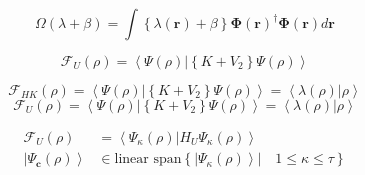 \documentclass[aps,preprint]{revtex4}%
\begin{document}
\[
\Omega\left(  \lambda+\beta\right)  =\int\left\{  \lambda\left(
\mathbf{r}\right)  +\beta\right\}  \mathbf{\Phi}\left(  \mathbf{r}\right)
^{\dagger}\mathbf{\Phi}\left(  \mathbf{r}\right)  d\mathbf{r}%
\]
%

\[
\mathcal{F}_{U}\left(  \rho\right)  =\left\langle \left.  \Psi\left(
\rho\right)  \right\vert \left\{  K+V_{2}\right\}  \Psi\left(  \rho\right)
\right\rangle
\]
%

\[
\mathcal{F}_{HK}\left(  \rho\right)  =\left\langle \left.  \Psi\left(
\rho\right)  \right\vert \left\{  K+V_{2}\right\}  \Psi\left(  \rho\right)
\right\rangle =\left\langle \lambda\left(  \rho\right)  \left\vert
\rho\right.  \right\rangle
\]%
\[
\mathcal{F}_{U}\left(  \rho\right)  =\left\langle \left.  \Psi\left(
\rho\right)  \right\vert \left\{  K+V_{2}\right\}  \Psi\left(  \rho\right)
\right\rangle =\left\langle \lambda\left(  \rho\right)  \left\vert
\rho\right.  \right\rangle
\]
%

\begin{align*}
\mathcal{F}_{U}\left(  \rho\right)   &  =\left\langle \Psi_{\kappa}\left(
\rho\right)  \left\vert H_{U}\right.  \Psi_{\kappa}\left(  \rho\right)
\right\rangle \\
\left\vert \Psi_{\mathbf{c}}\left(  \rho\right)  \right\rangle  &
\in\text{linear span}\left\{  \left.  \left\vert \Psi_{\kappa}\left(
\rho\right)  \right\rangle \right\vert \quad1\leq\kappa\leq\tau\right\}
\end{align*}
\end{document}
